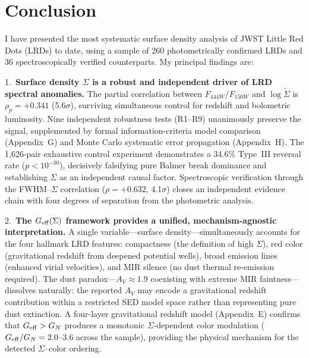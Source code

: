 \documentclass[apj,twocolumn,longbibliography,linenumbers]{aastex701}
\begin{document}

\section{Conclusion}

I have presented the most systematic surface density analysis of JWST Little Red Dots (LRDs) to date, using a sample of 260 photometrically confirmed LRDs and 36 spectroscopically verified counterparts. My principal findings are:

1.~\textbf{Surface density $\Sigma$ is a robust and independent driver of LRD spectral anomalies.} The partial correlation between $F_{444W}/F_{150W}$ and $\log\tilde\Sigma$ is $\rho_p = +0.341$ (5.6$\sigma$), surviving simultaneous control for redshift and bolometric luminosity. Nine independent robustness tests (R1--R9) unanimously preserve the signal, supplemented by formal information-criteria model comparison (Appendix~G) and Monte Carlo systematic error propagation (Appendix~H). The 1,626-pair exhaustive control experiment demonstrates a 34.6\% Type~III reversal rate ($p < 10^{-30}$), decisively falsifying pure Balmer break dominance and establishing $\Sigma$ as an independent causal factor. Spectroscopic verification through the FWHM--$\Sigma$ correlation ($\rho = +0.632$, 4.1$\sigma$) closes an independent evidence chain with four degrees of separation from the photometric analysis.

2.~\textbf{The $G_{\rm eff}(\Sigma)$ framework provides a unified, mechanism-agnostic interpretation.} A single variable---surface density---simultaneously accounts for the four hallmark LRD features: compactness (the definition of high $\Sigma$), red color (gravitational redshift from deepened potential wells), broad emission lines (enhanced virial velocities), and MIR silence (no dust thermal re-emission required). The dust paradox---$A_V \approx 1.9$ coexisting with extreme MIR faintness---dissolves naturally: the reported $A_V$ may encode a gravitational redshift contribution within a restricted SED model space rather than representing pure dust extinction. A four-layer gravitational redshift model (Appendix~E) confirms that $G_{\rm eff} > G_N$ produces a monotonic $\Sigma$-dependent color modulation ($G_{\rm eff}/G_N = 2.0$--$3.6$ across the sample), providing the physical mechanism for the detected $\Sigma$--color ordering.
\end{document}
